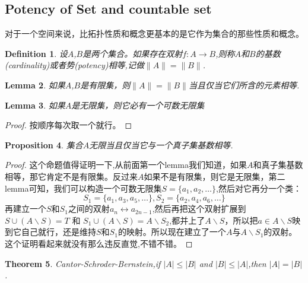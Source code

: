 \documentclass{article}
\newtheorem{theorem}{Theorem}[section]
\newtheorem{lemma}[theorem]{Lemma}
\newtheorem{proposition}[theorem]{Proposition}
\newtheorem{definition}[theorem]{Definition}
\newcommand*{\xfunc}[4]{{#2}\colon{#3}{#1}{#4}}
\newcommand*{\func}[3]{\xfunc{\to}{#1}{#2}{#3}}
\begin{document}
\newpage
\subsection{Potency of Set and countable set}

对于一个空间来说，比拓扑性质和概念更基本的是它作为集合的那些性质和概念。

\begin{definition}
设$A$,$B$是两个集合。如果存在双射$\func{f}{A}{B}$,则称$A$和$B$的基数(cardinality)或者势(potency)相等,记做$\|A\|=\|B\|$.
\end{definition}

\begin{lemma}
如果$A$,$B$是有限集，则$\|A\|=\|B\|$当且仅当它们所含的元素相等.
\end{lemma}

\begin{lemma}
如果$A$是无限集，则它必有一个可数无限集
\end{lemma}

\begin{proof}
按顺序每次取一个就行。
\end{proof}

\begin{proposition}
集合$A$无限当且仅当它与一个真子集基数相等.
\end{proposition}

\begin{proof}
这个命题值得证明一下,从前面第一个lemma我们知道，如果$A$和真子集基数相等，那它肯定不是有限集。反过来$A$如果不是有限集，则它是无限集，第二lemma可知，我们可以构造一个可数无限集$S=\{a_1,a_2,\ldots\}$,然后对它再分一个类：\[S_1 = \{a_1, a_3, a_5, \ldots\}, S_2 = \{a_2, a_4, a_6, \ldots\}\]再建立一个$S$和$S_1$之间的双射$a_n \leftrightarrow a_{2n-1}$,然后再把这个双射扩展到$S \cup (A \smallsetminus S) = T$ 和 $S_1 \cup (A \smallsetminus S) = A \smallsetminus S_2$,都并上了$A \smallsetminus S$，所以把$a \in A \smallsetminus S$映到它自己就行，还是维持$S$和$S_1$的映射。所以现在建立了一个$A$与$A \smallsetminus S_1$的双射。这个证明看起来就没有那么违反直觉,不错不错。
\end{proof}

\begin{theorem}
Cantor-Schroder-Bernstein,if $|A|\leq|B|$ and $|B|\leq |A|$,then $|A|=|B|$.
\end{theorem}
\end{document}
